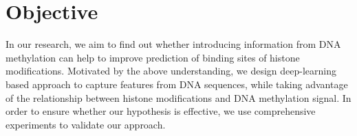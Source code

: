 \section{Objective}
In our research, we aim to find out whether introducing information from DNA methylation can help to improve prediction of binding sites of histone modifications. Motivated by the above understanding, we design deep-learning based approach to capture features from DNA sequences, while taking advantage of the relationship between histone modifications and DNA methylation signal. In order to ensure whether our hypothesis is effective, we use comprehensive experiments to validate our approach.
